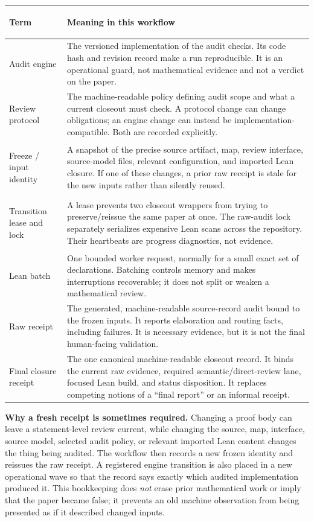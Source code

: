 \documentclass[10pt]{article}
\newcommand{\Lean}{Lean}
\begin{document}
\vspace{5pt}
\begin{tabularx}{\textwidth}{@{}>{\bfseries\raggedright\arraybackslash}p{}
  >{\raggedright\arraybackslash}X@{}}
\toprule
Term & Meaning in this workflow \\
\midrule
Audit engine & The versioned implementation of the audit checks. Its code hash
and revision record make a run reproducible. It is an operational guard, not
mathematical evidence and not a verdict on the paper. \\
\addlinespace
Review protocol & The machine-readable policy defining audit scope and what a
current closeout must check. A protocol change can change obligations; an engine
change can instead be implementation-compatible. Both are recorded explicitly. \\
\addlinespace
Freeze / input identity & A snapshot of the precise source artifact, map,
review interface, source-model files, relevant configuration, and imported
\Lean{} closure. If one of these changes, a prior raw receipt is stale for the
new inputs rather than silently reused. \\
\addlinespace
Transition lease and lock & A lease prevents two closeout wrappers from trying
to preserve/reissue the same paper at once. The raw-audit lock separately
serializes expensive \Lean{} scans across the repository. Their heartbeats are
progress diagnostics, not evidence. \\
\addlinespace
\Lean{} batch & One bounded worker request, normally for a small exact set of
declarations. Batching controls memory and makes interruptions recoverable; it
does not split or weaken a mathematical review. \\
\addlinespace
Raw receipt & The generated, machine-readable source-record audit bound to the
frozen inputs. It reports elaboration and routing facts, including failures.
It is necessary evidence, but it is not the final human-facing validation. \\
\addlinespace
Final closure receipt & The one canonical machine-readable closeout record. It
binds the current raw evidence, required semantic/direct-review lane, focused
\Lean{} build, and status disposition. It replaces competing notions of a
``final report'' or an informal receipt. \\
\bottomrule
\end{tabularx}

\vspace{6pt}
\textbf{Why a fresh receipt is sometimes required.}
Changing a proof body can leave a
statement-level review current, while changing the source, map, interface,
source model, selected audit policy, or relevant imported \Lean{} content
changes the thing being audited. The workflow then records a new frozen
identity and reissues the raw receipt. A registered engine transition is also
placed in a new operational wave so that the record says exactly which audited
implementation produced it. This bookkeeping does \emph{not} erase prior
mathematical work or imply that the paper became false; it prevents an old
machine observation from being presented as if it described changed inputs.
\end{document}
